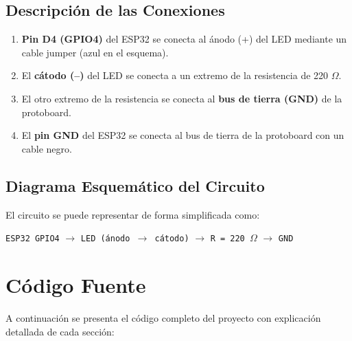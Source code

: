 \documentclass[12pt,a4paper]{article}
\begin{document}
\subsection{Descripción de las Conexiones}
\begin{enumerate}
    \item \textbf{Pin D4 (GPIO4)} del ESP32 se conecta al ánodo (+) del LED mediante un cable jumper (azul en el esquema).
    \item El \textbf{cátodo (--)} del LED se conecta a un extremo de la resistencia de 220 $\Omega$.
    \item El otro extremo de la resistencia se conecta al \textbf{bus de tierra (GND)} de la protoboard.
    \item El \textbf{pin GND} del ESP32 se conecta al bus de tierra de la protoboard con un cable negro.
\end{enumerate}

\subsection{Diagrama Esquemático del Circuito}
El circuito se puede representar de forma simplificada como:

\begin{center}
\texttt{ESP32 GPIO4} $\longrightarrow$ \texttt{LED (ánodo $\to$ cátodo)} $\longrightarrow$ \texttt{R = 220\,$\Omega$} $\longrightarrow$ \texttt{GND}
\end{center}

\section{Código Fuente}

A continuación se presenta el código completo del proyecto con explicación detallada de cada sección:
\end{document}

